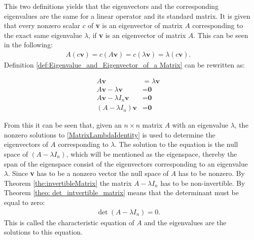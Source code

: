 This two definitions yields that the eigenvectors and the corresponding eigenvalues are the same for a linear operator and its standard matrix.
It is given that every nonzero scalar $c$ of \textbf{v} is an eigenvector of matrix $A$ corresponding to the exact same eigenvalue $\lambda$, if \textbf{v} is an eigenvector of matrix $A$. This can be seen in the following:
\begin{align*}
    A(c\textbf{v})=c(A\textbf{v})=c(\lambda\textbf{v})=\lambda(c\textbf{v}).
\end{align*}
Definition \ref{def:Eigenvalue_and_Eigenvector_of_a Matrix} can be rewritten as:

\begin{align}
\nonumber A\textbf{v}&=\lambda\textbf{v}\\ 
\nonumber A\textbf{v}-\lambda\textbf{v}&=\textbf{0}\\ 
\nonumber A\textbf{v}-\lambda I_n \textbf{v}&=\textbf{0}\\
(A-\lambda I_n)\textbf{v}&=\textbf{0}
\label{MatrixLambdaIdentity}
\end{align}

From this it can be seen that, given an $n\times n$ matrix $A$ with an eigenvalue $\lambda$, the nonzero solutions to \eqref{MatrixLambdaIdentity} is used to determine the eigenvectors of $A$ corresponding to $\lambda$.
The solution to the equation is the null space of $(A-\lambda I_n)$, which will be mentioned as the eigenspace, thereby the span of the eigenspace consist of the eigenvectors corresponding to an eigenvalue $\lambda$. Since \textbf{v} has to be a nonzero vector the null space of $A$ has to be nonzero. By Theorem \ref{the:invertibleMatrix} the matrix $A-\lambda I_n$ has to be non-invertible. By Theorem \ref{theo: det_intvertible_matrix} means that the determinant must be equal to zero:
\begin{align*}
    \det(A-\lambda I_n)=0.
\end{align*}
This is called the characteristic equation of $A$ and the eigenvalues are the solutions to this equation.  


